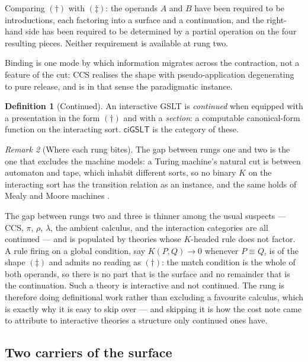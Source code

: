 \documentclass[11pt,a4paper]{article}
\theoremstyle{definition}
\newtheorem{definition}{Definition}[section]
\theoremstyle{plain}
\theoremstyle{remark}
\newtheorem{remark}[definition]{Remark}
\newcommand{\ciG}{\mathsf{ciGSLT}}
\newcommand{\rhoc}{\rho}
\begin{document}
Comparing $(\dagger)$ with $(\ddagger)$: the operands $A$ and $B$ have been required to be
introductions, each factoring into a surface and a continuation, and the right-hand side has been
required to be determined by a partial operation on the four resulting pieces. Neither requirement
is available at rung two.

Binding is one mode by which information migrates across the contraction, not a feature of the cut:
CCS realises the shape with pseudo-application degenerating to pure release, and is in that sense
the paradigmatic instance.

\begin{definition}[Continued]
\label{def:continued}
An interactive GSLT is \emph{continued} when equipped with a presentation in the form $(\dagger)$
and with a \emph{section}: a computable canonical-form function on the interacting sort. $\ciG$ is
the category of these.
\end{definition}

\begin{remark}[Where each rung bites]
\label{rmk:rungs}
The gap between rungs one and two is the one that excludes the machine models: a Turing machine's
natural cut is between automaton and tape, which inhabit different sorts, so no binary $K$ on the
interacting sort has the transition relation as an instance, and the same holds of Mealy and Moore
machines \cite[Rmk.~2.3]{probe}.

The gap between rungs two and three is thinner among the usual suspects --- CCS, $\pi$, $\rhoc$,
$\lambda$, the ambient calculus, and the interaction categories are all continued --- and is
populated by theories whose $K$-headed rule does not factor. A rule firing on a global condition,
say $K(P,Q) \to 0$ whenever $P \equiv Q$, is of the shape $(\ddagger)$ and admits no reading as
$(\dagger)$: the match condition is the whole of both operands, so there is no part that is the
surface and no remainder that is the continuation. Such a theory is interactive and not continued.
The rung is therefore doing definitional work rather than excluding a favourite calculus, which is
exactly why it is easy to skip over --- and skipping it is how the cost note came to attribute to
interactive theories a structure only continued ones have.
\end{remark}

\subsection{Two carriers of the surface}
\end{document}
